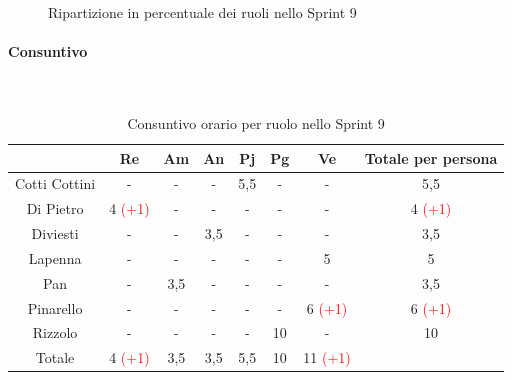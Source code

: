 \documentclass{article}
\begin{document}
                \begin{figure}[H]
                    \centering
                    \caption{Ripartizione in percentuale dei ruoli nello Sprint 9}
                \end{figure}


                \paragraph{Consuntivo}\mbox{}\\
                \begin{table}[H]
                    \centering
                    \begin{tabular}{|c|c|c|c|c|c|c|c|}
                    \hline
                                    & Re  & Am  & An  & Pj  & Pg  & Ve  & Totale per persona \\ \hline
                    Cotti Cottini & -   & -   & -   & 5,5 & -   & -   & 5,5                \\ \hline
                    Di Pietro     & 4 \textcolor{red}{(+1)}   & -   & -   & -   & -   & -   & 4 \textcolor{red}{(+1)}                  \\ \hline
                    Diviesti      & -   & -   & 3,5 & -   & -   & -   & 3,5                \\ \hline
                    Lapenna       & -   & -   & -   & -   & -   & 5   & 5                  \\ \hline
                    Pan           & -   & 3,5 & -   & -   & -   & -   & 3,5                \\ \hline
                    Pinarello     & -   & -   & -   & -   & -   & 6 \textcolor{red}{(+1)}   & 6 \textcolor{red}{(+1)}                  \\ \hline
                    Rizzolo       & -   & -   & -   & -   & 10  & -   & 10                 \\ \hline
                    Totale        & 4 \textcolor{red}{(+1)}   & 3,5 & 3,5 & 5,5 & 10  & 11 \textcolor{red}{(+1)}  &                    \\ \hline
                    \end{tabular}
                    \caption{Consuntivo orario per ruolo nello Sprint 9}
                \end{table}
\end{document}
